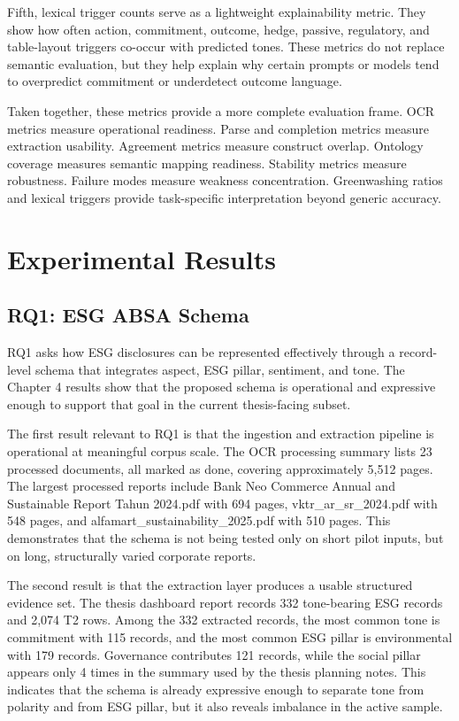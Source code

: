 \documentclass[english, online, cse, master]{dithesis}
\begin{document}
Fifth, lexical trigger counts serve as a lightweight explainability metric. They show how often action, commitment, outcome, hedge, passive, regulatory, and table-layout triggers co-occur with predicted tones. These metrics do not replace semantic evaluation, but they help explain why certain prompts or models tend to overpredict commitment or underdetect outcome language.

Taken together, these metrics provide a more complete evaluation frame. OCR metrics measure operational readiness. Parse and completion metrics measure extraction usability. Agreement metrics measure construct overlap. Ontology coverage measures semantic mapping readiness. Stability metrics measure robustness. Failure modes measure weakness concentration. Greenwashing ratios and lexical triggers provide task-specific interpretation beyond generic accuracy.

\section{Experimental Results}

\subsection{RQ1: ESG ABSA Schema}

RQ1 asks how ESG disclosures can be represented effectively through a record-level schema that integrates aspect, ESG pillar, sentiment, and tone. The Chapter 4 results show that the proposed schema is operational and expressive enough to support that goal in the current thesis-facing subset.

The first result relevant to RQ1 is that the ingestion and extraction pipeline is operational at meaningful corpus scale. The OCR processing summary lists 23 processed documents, all marked as done, covering approximately 5,512 pages. The largest processed reports include Bank Neo Commerce Annual and Sustainable Report Tahun 2024.pdf with 694 pages, vktr\_ar\_sr\_2024.pdf with 548 pages, and alfamart\_sustainability\_2025.pdf with 510 pages. This demonstrates that the schema is not being tested only on short pilot inputs, but on long, structurally varied corporate reports.

The second result is that the extraction layer produces a usable structured evidence set. The thesis dashboard report records 332 tone-bearing ESG records and 2,074 T2 rows. Among the 332 extracted records, the most common tone is commitment with 115 records, and the most common ESG pillar is environmental with 179 records. Governance contributes 121 records, while the social pillar appears only 4 times in the summary used by the thesis planning notes. This indicates that the schema is already expressive enough to separate tone from polarity and from ESG pillar, but it also reveals imbalance in the active sample.
\end{document}
